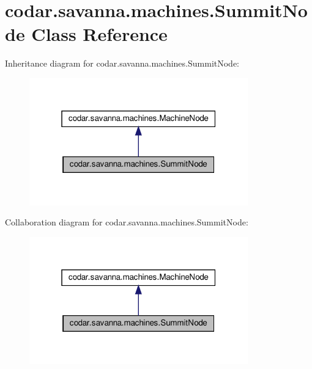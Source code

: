 \hypertarget{classcodar_1_1savanna_1_1machines_1_1_summit_node}{}\section{codar.\+savanna.\+machines.\+Summit\+Node Class Reference}
\label{classcodar_1_1savanna_1_1machines_1_1_summit_node}


Inheritance diagram for codar.\+savanna.\+machines.\+Summit\+Node\+:
\nopagebreak
\begin{figure}[H]
\begin{center}
\leavevmode
\includegraphics[width=268pt]{classcodar_1_1savanna_1_1machines_1_1_summit_node__inherit__graph}
\end{center}
\end{figure}


Collaboration diagram for codar.\+savanna.\+machines.\+Summit\+Node\+:
\nopagebreak
\begin{figure}[H]
\begin{center}
\leavevmode
\includegraphics[width=268pt]{classcodar_1_1savanna_1_1machines_1_1_summit_node__coll__graph}
\end{center}
\end{figure}
